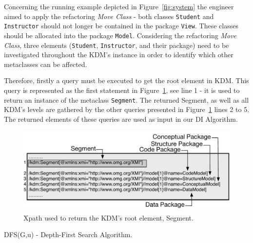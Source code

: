 Concerning the running example depicted in Figure~\ref{fig:system} the engineer aimed to apply the refactoring \textit{Move Class} - both classes \texttt{Student} and \texttt{Instructor} should not longer be contained in the package \texttt{View}. These classes should be allocated into the package \texttt{Model}. Considering the refactoring \textit{Move Class}, three elements (\texttt{Student}, \texttt{Instructor}, and their package) need to be investigated throughout the KDM's instance in order to identify which other metaclasses can be affected. 

Therefore, firstly a query must be executed to get the root element in KDM. This query is represented as the first statement in Figure~\ref{fig:queriesXPath}, see line 1 - it is used to return an instance of the metaclass \texttt{Segment}. The returned Segment, as well as all KDM's levels are gathered by the other queries presented in Figure~\ref{fig:queriesXPath} lines 2 to 5. The returned elements of these queries are used as input in our DI Algorithm.

\begin{figure}[h]
	\centering
	\includegraphics[scale=0.479]{figuras/queiresANDATLSBESNew}
	\caption{Xpath used to return the KDM's root element, Segment.}
	\label{fig:queriesXPath}
\end{figure}


\begin{algorithm}[h]
     \SetAlgoLined
     \caption{DFS(G,u) - Depth-First Search Algorithm.}
     \label{alg:death1}
   \end{algorithm}

